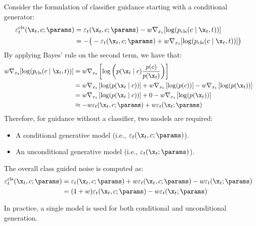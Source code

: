 \begin{description}
        Consider the formulation of classifier guidance starting with a conditional generator: 
        \[
            \begin{split}
                \varepsilon_t^{\text{cls}}(\x_t, c; \params) 
                &= \varepsilon_t(\x_t, c; \params) - w \nabla_{x_t}[ \log(p_\text{cls}(c \mid \x_t, t)) ] \\
                &= - \big( - \varepsilon_t(\x_t, c; \params) + w \nabla_{x_t}[ \log(p_\text{cls}(c \mid \x_t, t)) ] \big)
            \end{split}
        \]
        By applying Bayes' rule on the second term, we have that:
        \[
            \begin{split}
                w \nabla_{x_t}[ \log(p_\text{cls}(c \mid \x_t, t)) ]
                &= w \nabla_{x_t}\left[ \log\left( p(\x_t \mid c) \frac{p(c)}{p(\x_t)} \right) \right] \\
                &= w \nabla_{x_t}\left[ \log(p(\x_t \mid c)) \right] + w \nabla_{x_t}\left[ \log(p(c)) \right] - w \nabla_{x_t}\left[ \log(p(\x_t)) \right] \\
                &= w \nabla_{x_t}\left[ \log(p(\x_t \mid c)) \right] + 0 - w \nabla_{x_t}\left[ \log(p(\x_t)) \right] \\
                &\approx - w \varepsilon_t(\x_t, c; \params) + w \varepsilon_t(\x_t; \params)
            \end{split}
        \]
        Therefore, for guidance without a classifier, two models are required:
        \begin{itemize}
            \item A conditional generative model (i.e., $\varepsilon_t(\x_t, c; \params)$).
            \item An unconditional generative model (i.e., $\varepsilon_t(\x_t; \params)$).
        \end{itemize}
        The overall class guided noise is computed as:
        \[ 
            \begin{split}
                \varepsilon_t^{\text{cls}}(\x_t, c; \params) 
                &= \varepsilon_t(\x_t, c; \params) + w \varepsilon_t(\x_t, c; \params) - w \varepsilon_t(\x_t; \params) \\
                &= (1 + w) \varepsilon_t(\x_t, c; \params) - w \varepsilon_t(\x_t; \params)
            \end{split}
        \]

        \begin{remark}
            In practice, a single model is used for both conditional and unconditional generation.
        \end{remark}


\end{description}
